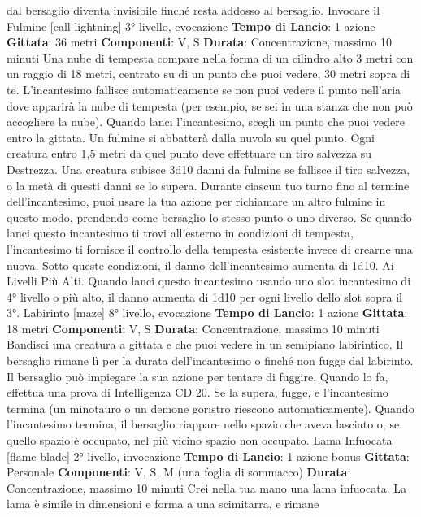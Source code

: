 \begin{multicols}{2}
dal bersaglio diventa invisibile finché resta addosso al
bersaglio.
Invocare il Fulmine
[call lightning]
3° livello, evocazione
\textbf{Tempo di Lancio}: 1 azione
\textbf{Gittata}: 36 metri
\textbf{Componenti}: V, S
\textbf{Durata}: Concentrazione, massimo 10 minuti
Una nube di tempesta compare nella forma di un
cilindro alto 3 metri con un raggio di 18 metri, centrato
su di un punto che puoi vedere, 30 metri sopra di te.
L’incantesimo fallisce automaticamente se non puoi
vedere il punto nell’aria dove apparirà la nube di
tempesta (per esempio, se sei in una stanza che non
può accogliere la nube).
Quando lanci l’incantesimo, scegli un punto che puoi
vedere entro la gittata. Un fulmine si abbatterà dalla
nuvola su quel punto. Ogni creatura entro 1,5 metri da
quel punto deve effettuare un tiro salvezza su
Destrezza. Una creatura subisce 3d10 danni da fulmine
se fallisce il tiro salvezza, o la metà di questi danni se lo
supera. Durante ciascun tuo turno fino al termine
dell’incantesimo, puoi usare la tua azione per
richiamare un altro fulmine in questo modo, prendendo
come bersaglio lo stesso punto o uno diverso.
Se quando lanci questo incantesimo ti trovi all’esterno
in condizioni di tempesta, l’incantesimo ti fornisce il
controllo della tempesta esistente invece di crearne una
nuova. Sotto queste condizioni, il danno
dell’incantesimo aumenta di 1d10.
Ai Livelli Più Alti. Quando lanci questo incantesimo
usando uno slot incantesimo di 4° livello o più alto, il
danno aumenta di 1d10 per ogni livello dello slot sopra
il 3°.
Labirinto
[maze]
8° livello, evocazione
\textbf{Tempo di Lancio}: 1 azione
\textbf{Gittata}: 18 metri
\textbf{Componenti}: V, S
\textbf{Durata}: Concentrazione, massimo 10 minuti
Bandisci una creatura a gittata e che puoi vedere in un
semipiano labirintico. Il bersaglio rimane lì per la durata
dell’incantesimo o finché non fugge dal labirinto.
Il bersaglio può impiegare la sua azione per tentare di
fuggire. Quando lo fa, effettua una prova di Intelligenza
CD 20. Se la supera, fugge, e l’incantesimo termina (un
minotauro o un demone goristro riescono
automaticamente).
Quando l’incantesimo termina, il bersaglio riappare
nello spazio che aveva lasciato o, se quello spazio è
occupato, nel più vicino spazio non occupato.
Lama Infuocata
[flame blade]
2° livello, invocazione
\textbf{Tempo di Lancio}: 1 azione bonus
\textbf{Gittata}: Personale
\textbf{Componenti}: V, S, M (una foglia di sommacco)
\textbf{Durata}: Concentrazione, massimo 10 minuti
Crei nella tua mano una lama infuocata. La lama è
simile in dimensioni e forma a una scimitarra, e rimane

\end{multicols}
